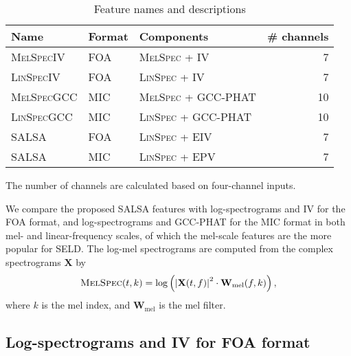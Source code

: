 \documentclass[journal]{IEEEtran}
\newcommand*{\gccphat}{\mbox{GCC-PHAT}\xspace}
\begin{document}
\begin{table}[t]
    \centering
    \caption {Feature names and descriptions}  
    \label{tab:features}
    \noindent\begin{tabularx}{\columnwidth}{llXr}
    \toprule
    Name & Format &  Components & \# channels \\ 
    \midrule
    \textsc{MelSpecIV}       & FOA   & \textsc{MelSpec} + IV & \num{7} \\
    \textsc{LinSpecIV}       & FOA   & \textsc{LinSpec} + IV  & \num{7}\\
    \textsc{MelSpecGCC}       & MIC   & \textsc{MelSpec} + GCC-PHAT & \num{10}\\
    \textsc{LinSpecGCC}       & MIC   & \textsc{LinSpec} + GCC-PHAT  & \num{10}\\
    \midrule
    SALSA           & FOA   & \textsc{LinSpec} + EIV & \num{7} \\
    SALSA           & MIC   & \textsc{LinSpec} + EPV & \num{7} \\
    \bottomrule
    \end{tabularx}
    \begin{justify}
        The number of channels are calculated based on four-channel inputs.
    \end{justify}
\end{table}

We compare the proposed SALSA features with log-spectrograms and IV for the FOA format, and log-spectrograms and \gccphat for the MIC format in both mel- and linear-frequency scales, of which the mel-scale features are the more popular for SELD. The log-mel spectrograms are computed from the complex spectrograms $\mathbf{X}$ by
\begin{equation}
    \textsc{MelSpec}(t,k) = \log\left(\left\lvert\mathbf{X}(t,f)\right\rvert^2 \cdot \mathbf{W}_\text{mel}(f,k)\right),
    \label{eq:melspec}
\end{equation}
where $k$ is the mel index, and $\mathbf{W}_\text{mel}$ is the mel filter. 

\subsection{Log-spectrograms and IV for FOA format}
\end{document}
